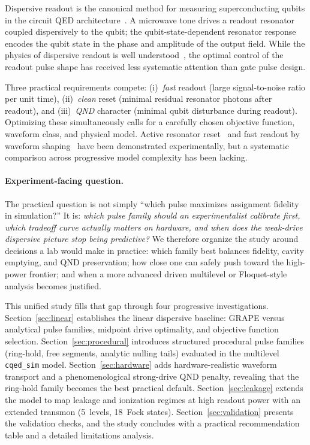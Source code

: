 \documentclass[aps,pra,twocolumn,reprint,amsmath,amssymb]{revtex4-2}
\begin{document}
Dispersive readout is the canonical method for measuring superconducting qubits in the circuit QED architecture~\cite{blais2021circuit,krantz2019quantum}. A microwave tone drives a readout resonator coupled dispersively to the qubit; the qubit-state-dependent resonator response encodes the qubit state in the phase and amplitude of the output field. While the physics of dispersive readout is well understood~\cite{gambetta2007protocols,boissonneault2009dispersive}, the optimal control of the readout pulse shape has received less systematic attention than gate pulse design.

Three practical requirements compete: (i)~\emph{fast} readout (large signal-to-noise ratio per unit time), (ii)~\emph{clean} reset (minimal residual resonator photons after readout), and (iii)~\emph{QND} character (minimal qubit disturbance during readout). Optimizing these simultaneously calls for a carefully chosen objective function, waveform class, and physical model. Active resonator reset~\cite{mcclure2016rapid} and fast readout by waveform shaping~\cite{walter2017rapid,jeffrey2014fast} have been demonstrated experimentally, but a systematic comparison across progressive model complexity has been lacking.

\paragraph{Experiment-facing question.}
The practical question is not simply ``which pulse maximizes assignment fidelity in simulation?'' It is: \emph{which pulse family should an experimentalist calibrate first, which tradeoff curve actually matters on hardware, and when does the weak-drive dispersive picture stop being predictive?} We therefore organize the study around decisions a lab would make in practice: which family best balances fidelity, cavity emptying, and QND preservation; how close one can safely push toward the high-power frontier; and when a more advanced driven multilevel or Floquet-style analysis becomes justified.

This unified study fills that gap through four progressive investigations. Section~\ref{sec:linear} establishes the linear dispersive baseline: GRAPE versus analytical pulse families, midpoint drive optimality, and objective function selection. Section~\ref{sec:procedural} introduces structured procedural pulse families (ring-hold, free segments, analytic nulling tails) evaluated in the multilevel \texttt{cqed\_sim} model. Section~\ref{sec:hardware} adds hardware-realistic waveform transport and a phenomenological strong-drive QND penalty, revealing that the ring-hold family becomes the best practical default. Section~\ref{sec:leakage} extends the model to map leakage and ionization regimes at high readout power with an extended transmon (5~levels, 18~Fock states). Section~\ref{sec:validation} presents the validation checks, and the study concludes with a practical recommendation table and a detailed limitations analysis.
\end{document}
